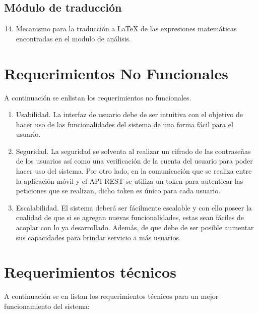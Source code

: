     \subsection{Módulo de traducción}
    \begin{enumerate}[label=RF\arabic*.]
    	\setcounter{enumi}{13}
    	\item Mecanismo para la traducción a \LaTeX{} de las expresiones matemáticas encontradas en el modulo de análisis.
    \end{enumerate}
    
\section{Requerimientos No Funcionales} 
    A continuación se enlistan los requerimientos no funcionales.
        \begin{enumerate}[label=RNF\arabic*.]
    
            \item Usabilidad. La interfaz de usuario debe de ser intuitiva con el objetivo de hacer uso de las funcionalidades del sistema de una forma fácil para el usuario.
            
            \item Seguridad. La seguridad se solventa al realizar un cifrado de las contraseñas de los usuarios así como una verificación de la cuenta del usuario para poder hacer uso del sistema. Por otro lado, en la comunicación que se realiza entre la aplicación móvil y el API REST se utiliza un token para autenticar las peticiones que se realizan, dicho token es único para cada usuario. 
            
            \item Escalabilidad. El sistema deberá ser fácilmente escalable y con ello poseer la cualidad de que si se agregan nuevas funcionalidades, estas sean fáciles de acoplar con lo ya desarrollado. Además, de que debe de ser posible aumentar sus capacidades para brindar servicio a más usuarios.
            
        \end{enumerate}    
\section{Requerimientos técnicos}
    A continuación se en listan los requerimientos técnicos para un mejor funcionamiento del sistema:
